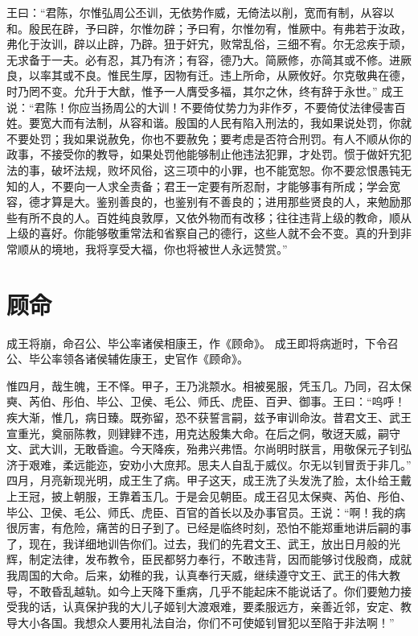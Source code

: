 \documentclass[12pt,UTF8]{ctexbook}
\begin{document}
王曰：“君陈，尔惟弘周公丕训，无依势作威，无倚法以削，宽而有制，从容以和。殷民在辟，予曰辟，尔惟勿辟；予曰宥，尔惟勿宥，惟厥中。有弗若于汝政，弗化于汝训，辟以止辟，乃辟。狃于奸宄，败常乱俗，三细不宥。尔无忿疾于顽，无求备于一夫。必有忍，其乃有济；有容，德乃大。简厥修，亦简其或不修。进厥良，以率其或不良。惟民生厚，因物有迁。违上所命，从厥攸好。尔克敬典在德，时乃罔不变。允升于大猷，惟予一人膺受多福，其尔之休，终有辞于永世。”
成王说：“君陈！你应当扬周公的大训！不要倚仗势力为非作歹，不要倚仗法律侵害百姓。要宽大而有法制，从容和谐。殷国的人民有陷入刑法的，我如果说处罚，你就不要处罚；我如果说赦免，你也不要赦免；要考虑是否符合刑罚。有人不顺从你的政事，不接受你的教导，如果处罚他能够制止他违法犯罪，才处罚。惯于做奸宄犯法的事，破坏法规，败坏风俗，这三项中的小罪，也不能宽恕。你不要忿恨愚钝无知的人，不要向一人求全责备；君王一定要有所忍耐，才能够事有所成；学会宽容，德才算是大。鉴别善良的，也鉴别有不善良的；进用那些贤良的人，来勉励那些有所不良的人。百姓纯良敦厚，又依外物而有改移；往往违背上级的教命，顺从上级的喜好。你能够敬重常法和省察自己的德行，这些人就不会不变。真的升到非常顺从的境地，我将享受大福，你也将被世人永远赞赏。”

\chapter{顾命}

成王将崩，命召公、毕公率诸侯相康王，作《顾命》。
成王即将病逝时，下令召公、毕公率领各诸侯辅佐康王，史官作《顾命》。

惟四月，哉生魄，王不怿。甲子，王乃洮颒水。相被冕服，凭玉几。乃同，召太保奭、芮伯、彤伯、毕公、卫侯、毛公、师氏、虎臣、百尹、御事。王曰：“呜呼！疾大渐，惟几，病日臻。既弥留，恐不获誓言嗣，兹予审训命汝。昔君文王、武王宣重光，奠丽陈教，则肄肄不违，用克达殷集大命。在后之侗，敬迓天威，嗣守文、武大训，无敢昏逾。今天降疾，殆弗兴弗悟。尔尚明时朕言，用敬保元子钊弘济于艰难，柔远能迩，安劝小大庶邦。思夫人自乱于威仪。尔无以钊冒贡于非几。”
四月，月亮新现光明，成王生了病。甲子这天，成王洗了头发洗了脸，太仆给王戴上王冠，披上朝服，王靠着玉几。于是会见朝臣。成王召见太保奭、芮伯、彤伯、毕公、卫侯、毛公、师氏、虎臣、百官的首长以及办事官员。王说：“啊！我的病很厉害，有危险，痛苦的日子到了。已经是临终时刻，恐怕不能郑重地讲后嗣的事了，现在，我详细地训告你们。过去，我们的先君文王、武王，放出日月般的光辉，制定法律，发布教令，臣民都努力奉行，不敢违背，因而能够讨伐殷商，成就我周国的大命。后来，幼稚的我，认真奉行天威，继续遵守文王、武王的伟大教导，不敢昏乱越轨。如今上天降下重病，几乎不能起床不能说话了。你们要勉力接受我的话，认真保护我的大儿子姬钊大渡艰难，要柔服远方，亲善近邻，安定、教导大小各国。我想众人要用礼法自治，你们不可使姬钊冒犯以至陷于非法啊！”
\end{document}
